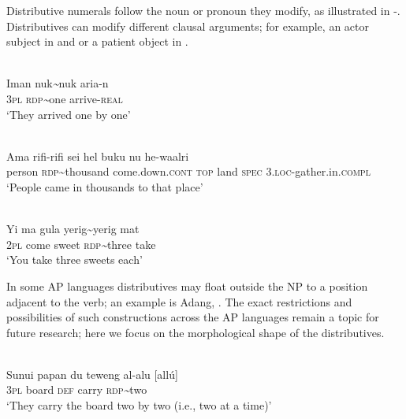 \documentclass[output=paper]{LSP/langsci}
\begin{document}
Distributive numerals follow the noun or pronoun they modify, as illustrated in -. Distributives can modify different clausal arguments; for example, an actor subject in  and  or a patient object in .


\ea%
\label{bkm:Ref342655549}
\\
\gll Iman  nuk\textit{\~{}}nuk  aria-n\\  
    \textsc{3pl}   \textsc{rdp}\textit{\~{}}one   arrive-\textsc{real}\\
\glt `They arrived one by one' 
\z

    

   


\ea%
\label{bkm:Ref342738939}
\\
\gll  Ama    rifi-rifi    sei        hel  buku  nu  he-waalri \\  
    person    \textsc{rdp\~{}}thousand   come.down.\textsc{cont}    \textsc{top  } land  \textsc{spec}   3.\textsc{loc-}gather.in.\textsc{compl}  \\
\glt `People came in thousands to that place' 
\z

    
 

   

   

\ea%
\label{bkm:Ref342655553}
\\
\gll Yi   ma   gula   yerig\~{}yerig   mat\\  
     2\textsc{pl } come  sweet  \textsc{rdp}\textit{\~{}}three  take \\
\glt `You take three sweets each'
\z

   

  

   

In some AP languages distributives may float outside the NP to a position adjacent to the verb; an example is Adang, . The exact restrictions and possibilities of such constructions across the AP languages remain a topic for future research; here we focus on the morphological shape of the distributives.


\ea
\label{ex:8:1235}
\\
 \gll  Sunui{\textltailn}   papan   du   teweng al-alu  [all\'u]\\
   3\textsc{pl}    board  \textsc{def}   carry   \textsc{rdp}\textit{\~{}}two \\
 \glt `They carry the board two by two (i.e., two at a time)'
\z
\end{document}
